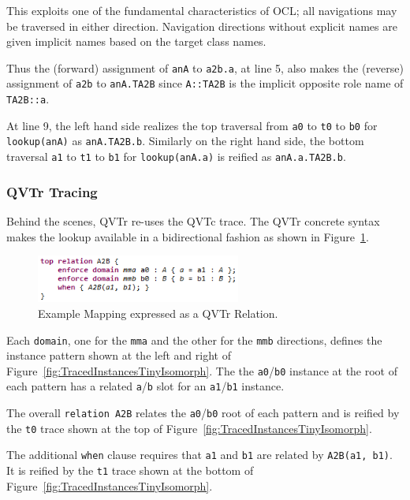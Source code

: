 \documentclass{jot}
\begin{document}
This exploits one of the fundamental characteristics of OCL; all navigations may be traversed in either direction. Navigation directions without explicit names are given implicit names based on the target class names.

Thus the (forward) assignment of \verb|anA| to \verb|a2b.a|, at line 5, also makes the (reverse) assignment of \verb|a2b| to \verb|anA.TA2B| since \verb|A::TA2B| is the implicit opposite role name of \verb|TA2B::a|.

At line 9, the left hand side realizes the top traversal from \verb|a0| to \verb|t0| to \verb|b0| for \verb|lookup(anA)| as \verb|anA.TA2B.b|. Similarly on the right hand side, the bottom traversal \verb|a1| to \verb|t1| to \verb|b1| for \verb|lookup(anA.a)| is reified as \verb|anA.a.TA2B.b|.

\subsubsection{QVTr Tracing}

Behind the scenes, QVTr re-uses the QVTc trace. The QVTr concrete syntax makes the lookup available in a bidirectional fashion as shown in Figure~\ref{fig:QVTrTinyIsomorph}.

\begin{figure}[h]
	\centering
	\includegraphics[width=0.6\textwidth]{QVTrTinyIsomorph.png}
	\caption{Example Mapping expressed as a QVTr Relation.}
	\label{fig:QVTrTinyIsomorph}
\end{figure}

Each \verb|domain|, one for the \verb|mma| and the other for the \verb|mmb| directions, defines the instance pattern shown at the left and right of Figure~\ref{fig:TracedInstancesTinyIsomorph}. The the \verb|a0|/\verb|b0| instance at the root of each pattern has a related \verb|a|/\verb|b| slot for an \verb|a1|/\verb|b1| instance.

The overall \verb|relation A2B| relates the \verb|a0|/\verb|b0| root of each pattern and is reified by the \verb|t0| trace shown at the top of Figure~\ref{fig:TracedInstancesTinyIsomorph}.

The additional \verb|when| clause requires that \verb|a1| and \verb|b1| are related by \verb|A2B(a1, b1)|. It is reified by the \verb|t1| trace shown at the bottom of Figure~\ref{fig:TracedInstancesTinyIsomorph}.
\end{document}
